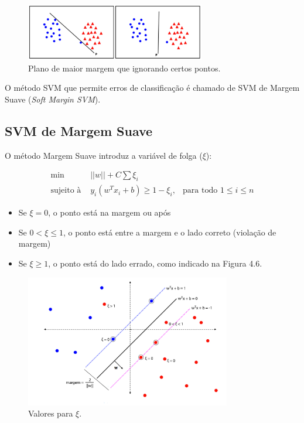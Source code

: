 \begin{figure}[htpb]
	\begin{center}
		\includegraphics[width=0.7\textwidth]{figuras/svm-soft-margin.pdf}
		\caption{Plano de maior margem que ignorando certos pontos.}
	\end{center}
\end{figure}

O método SVM que permite erros de classificação é chamado de SVM de Margem Suave (\textit{Soft Margin SVM}).

\subsection*{SVM de Margem Suave}

O método Margem Suave introduz a variável de folga ($\xi$):

\begin{equation}
\begin{matrix}
\min & ||w|| + C \sum {\xi}_{i} & \\ 
\text{sujeito à } & {y}_{i}({w}^{T}{x}_{i} + b) \geq 1 - {\xi}_{i}, & \text{para todo } 1 \leq i \leq n
\end{matrix}
\end{equation}

\begin{itemize}
	\item Se $\xi = 0$, o ponto está na margem ou após
	\item Se $0 < \xi \leq 1$, o ponto está entre a margem e o lado correto (violação de margem)
	\item Se $\xi \geq 1$, o ponto está do lado errado, como indicado na Figura 4.6.
\end{itemize}

\begin{figure}[htpb]
	\begin{center}
		\includegraphics[width=0.8\textwidth]{figuras/svm-epsilons.pdf}
		\caption{Valores para $\xi$.}
	\end{center}
\end{figure}

